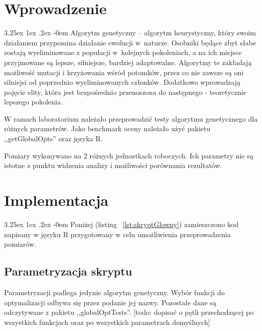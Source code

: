 \documentclass[11pt, a4paper]{article}
\date{\today}
\makeatletter
\newcommand{\fbi}{\leavevmode{\parindent=1em\indent}}
\renewcommand\paragraph{\@startsection{paragraph}{5}{\z@}
  {3.25ex \@plus1ex \@minus.2ex}
  {-0em}
  {\normalfont\normalsize\bfseries}}
\makeatother
\begin{document}


\tableofcontents

\newpage
\section{Wprowadzenie}
\paragraph{}
Algorytm genetyczny – algorytm heurystyczny, który swoim działaniem przypomina działanie ewolucji w~naturze. Osobniki będące zbyt słabe zostają wyeliminowane z populacji w~kolejnych pokoleniach, a na ich miejsce przyjmowane są lepsze, silniejsze, bardziej adaptowalne. Algorytmy te zakładają możliwość mutacji i krzyżowania wśród potomków, przez co nie zawsze są oni silniejsi od poprzednio wyeliminowanych członków. Dodatkowo wprowadzają pojęcie elity, która jest bezpośrednio przenoszona do następnego - teoretycznie lepszego pokolenia.

\fbi
W ramach laboratorium należało przeprowadzić testy algorytmu genetycznego dla różnych parametrów. Jako benchmark oceny należało użyć pakietu ,,getGlobalOpts'' oraz języka R.

\fbi
Pomiary wykonywano na 2 różnych jednostkach roboczych. Ich parametry nie są istotne z punktu widzenia analizy i możliwości porównania rezultatów.

\section{Implementacja}
\paragraph{}
Poniżej (listing ~\ref{lst:skryptGlowny}) zamieszczono kod napisany w języku R przygotowany w celu umożliwienia przeprowadzenia pomiarów.



\subsection{Parametryzacja skryptu}
Parametryzacji podlega jedynie algorytm genetyczny.
Wybór funkcji do optymalizacji odbywa się przez podanie jej nazwy.
Pozostałe dane są odczytywane z pakietu ,,globalOptTests''.
[todo: dopisać o pętli przechodzącej po wszystkich funkcjach oraz po wszystkich parametrach domyślnych]
\end{document}
